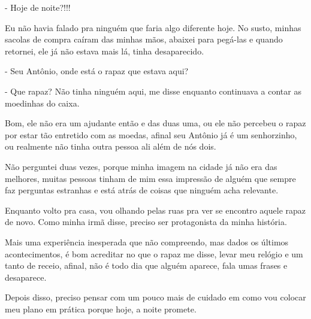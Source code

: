 - Hoje de noite?!!!

Eu não havia falado pra ninguém que faria algo diferente hoje. No susto, minhas sacolas de compra caíram das minhas mãos, abaixei para pegá-las e quando retornei, ele já não estava mais lá, tinha desaparecido.

- Seu Antônio, onde está o rapaz que estava aqui? 

- Que rapaz? Não tinha ninguém aqui, me disse enquanto continuava a contar as moedinhas do caixa.

Bom, ele não era um ajudante então e das duas uma, ou ele não percebeu o rapaz por estar tão entretido com as moedas, afinal seu Antônio já é um senhorzinho, ou realmente não tinha outra pessoa ali além de nós dois.

Não perguntei duas vezes, porque minha imagem na cidade já não era das melhores, muitas pessoas tinham de mim essa impressão de alguém que sempre faz perguntas estranhas e está atrás de coisas que ninguém acha relevante. 

Enquanto volto pra casa, vou olhando pelas ruas pra ver se encontro aquele rapaz de novo. Como minha irmã disse, preciso ser protagonista da minha história.

Mais uma experiência inesperada que não compreendo, mas dados os últimos acontecimentos, é bom acreditar no que o rapaz me disse, levar meu relógio e um tanto de receio, afinal, não é todo dia que alguém aparece, fala umas frases e desaparece. 

Depois disso, preciso pensar com um pouco mais de cuidado em como vou colocar meu plano em prática porque hoje, a noite promete.


